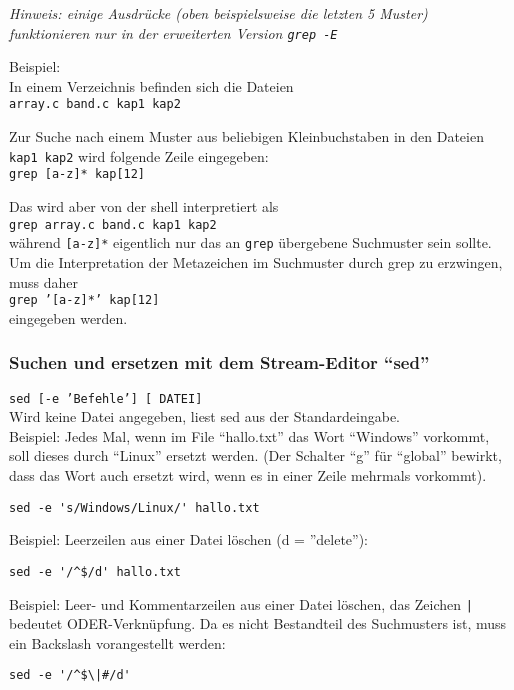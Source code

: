 \documentclass[11pt]{article}
\begin{document}
\textit{Hinweis: einige Ausdrücke (oben beispielsweise die letzten 5 Muster) funktionieren nur in der erweiterten
Version \texttt{grep -E}}

Beispiel:\\
In einem Verzeichnis befinden sich die Dateien\\ 
\texttt{array.c band.c kap1 kap2}

Zur Suche nach einem Muster aus beliebigen Kleinbuchstaben in den
Dateien \texttt{kap1 kap2} wird folgende Zeile eingegeben:\\
\texttt{grep [a-z]* kap[12]}

Das wird aber von der shell interpretiert als\\
\texttt{grep array.c band.c kap1 kap2} \\
während \texttt{[a-z]*} eigentlich nur das an \texttt{grep} übergebene
Suchmuster sein sollte. Um die Interpretation der Metazeichen im
Suchmuster durch grep zu erzwingen, muss daher\\
\texttt{grep '[a-z]*' kap[12]}\\
eingegeben werden.\\

\subsubsection{Suchen und ersetzen mit dem Stream-Editor ``sed''}

\texttt{sed [-e 'Befehle'] [ DATEI]} \\
Wird keine Datei angegeben, liest sed aus der Standardeingabe.\\

Beispiel: Jedes Mal, wenn im File ``hallo.txt'' das Wort ``Windows''  vorkommt,
soll dieses durch ``Linux'' ersetzt werden. (Der Schalter ``g'' für ``global''
bewirkt, dass das Wort auch ersetzt wird, wenn es in einer Zeile mehrmals vorkommt).
\begin{verbatim}
sed -e 's/Windows/Linux/' hallo.txt
\end{verbatim}

Beispiel: Leerzeilen aus einer Datei löschen (d = ''delete''):
\begin{verbatim}
sed -e '/^$/d' hallo.txt
\end{verbatim}

Beispiel: Leer- und Kommentarzeilen aus einer Datei löschen, das Zeichen \texttt{|} 
bedeutet ODER-Verknüpfung. Da es nicht Bestandteil des Suchmusters ist, muss ein 
Backslash vorangestellt werden:
\begin{verbatim}
sed -e '/^$\|#/d'
\end{verbatim}
\end{document}
